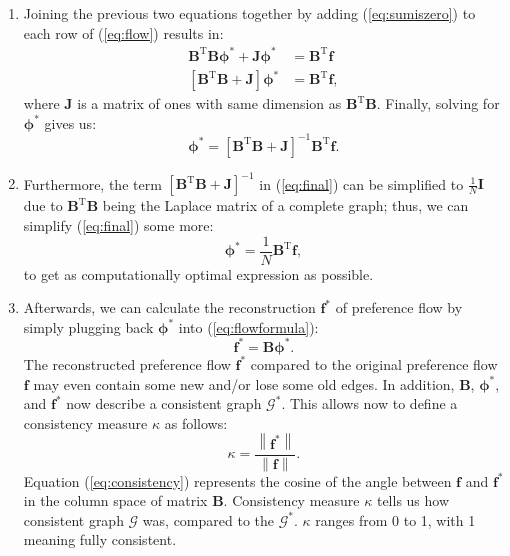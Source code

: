 \documentclass[letterpaper, 10 pt, conference]{ieeeconf}
\newcommand{\matr}[1]{\mathbold{#1}}
\newcommand{\graph}[1]{\bm{\mathcal{#1}}}
\newcommand{\T}{\mathrm{T}}
\begin{document}
\begin{enumerate}
    \item Joining the previous two equations together by adding (\ref{eq:sumiszero}) to each row of (\ref{eq:flow}) results in:
    \begin{equation*}
    \begin{aligned}
    \matr{B}^\T \matr{B} \matr{\phi^*} + \matr{J} \matr{\phi^*} &= \matr{B}^\T \matr{f}\\
    \left[\matr{B}^\T \matr{B} + \matr{J} \right] \matr{\phi^*} &= \matr{B}^\T \matr{f},
    \end{aligned}
    \end{equation*}
    where $\matr{J}$ is a matrix of ones with same dimension as $\matr{B}^\T \matr{B}$.
    Finally, solving for $\matr{\phi^*}$ gives us:
    \begin{equation}
    \label{eq:final}
    \matr{\phi^*} = \left[\matr{B}^\T \matr{B} + \matr{J} \right]^{-1} \matr{B}^\T \matr{f}.
    \end{equation}
    \item Furthermore, the term $\left[ \matr{B}^\T \matr{B} + \matr{J} \right]^{-1}$ in (\ref{eq:final}) can be simplified to $\frac{1}{N} \matr{I}$ due to $\matr{B}^\T \matr{B}$ being the Laplace matrix of a complete graph; thus, we can simplify (\ref{eq:final}) some more:
    \begin{equation}
    \matr{\phi^*} = \frac{1}{N} \matr{B}^\T \matr{f},
    \end{equation}
    to get as computationally optimal expression as possible.
    
    \item Afterwards, we can calculate the reconstruction $\matr{f}^*$ of preference  flow by simply plugging back $\matr{\phi^*}$ into (\ref{eq:flowformula}):
    \begin{equation}
    \matr{f^*} = \matr{B} \matr{\phi^*}.
    \end{equation}
    The reconstructed preference flow $\matr{f^*}$ compared to the original preference flow $\matr{f}$ may even contain some new and/or lose some old edges.
    In addition, $\matr{B}$, $\matr{\phi^*}$, and $\matr{f^*}$ now describe a consistent graph $\graph{G^*}$.
    This allows now to define a consistency measure $\kappa$ as follows:
    \begin{equation}
    \label{eq:consistency}
    \kappa = \frac{\left \lVert \matr{f^*} \right \rVert}{\left \lVert \matr{f} \right \rVert}.
    \end{equation}
    Equation (\ref{eq:consistency}) represents the cosine of the angle between $\matr{f}$ and $\matr{f^*}$ in the column space of matrix $\matr{B}$.
    Consistency measure $\kappa$ tells us how consistent graph $\graph{G}$ was, compared to the $\graph{G^*}$.
    $\kappa$ ranges from 0 to 1, with 1 meaning fully consistent.
    
  \end{enumerate}
  
\end{document}
